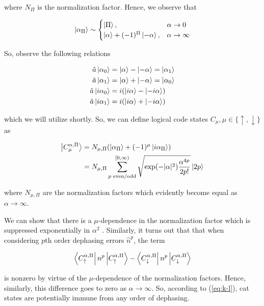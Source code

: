 \documentclass[12]{amsart}
\newcommand\0{\mathbf{0}}
\newcommand\<{\langle}
\renewcommand\>{\rangle}
\begin{document}
where $N_\Pi$ is the normalization factor. Hence, we observe that

\begin{align*}
\ket{\alpha_\Pi} \sim \begin{cases} \ket{\Pi},  &\alpha \rightarrow 0\\ \ket{\alpha} + (-1)^\Pi \ket{-\alpha}, &\alpha \rightarrow \infty \end{cases}
\end{align*}

So, observe the following relations

\begin{align}
\label{eq:cat-rels}
\begin{split}
\hat{a} \ket{\alpha_0} &= \ket{\alpha} - \ket{-\alpha} = \ket{\alpha_1} \\
\hat{a} \ket{\alpha_1} &= \ket{\alpha} + \ket{-\alpha} = \ket{\alpha_0} \\
\hat{a} \ket{i\alpha_0} &= i(\ket{i\alpha} - \ket{-i\alpha})\\
\hat{a} \ket{i\alpha_1} &= i(\ket{i\alpha}  + \ket{-i\alpha})
\end{split}
\end{align}

which we will utilize shortly. So, we can define logical code states $C_\mu, \mu \in \{ \uparrow, \downarrow \}$ as 

\begin{align*}
\ket{C_\mu^{\alpha, \Pi}} &= N_{\mu, \Pi} (\ket{\alpha_\Pi} + (-1)^\mu \ket{i \alpha_\Pi})\\
&= N_{\mu, \Pi} \sum_{p\text{ even/odd}}^{[0, \infty)}\sqrt{\exp(-|\alpha|^2)\frac{
\alpha^{4p}}{2p!}}\ket{2p}
\end{align*}

where $N_{\mu, \Pi}$ are the normalization factors which evidently become equal as $\alpha \rightarrow \infty$. 


We can show that there is a $\mu$-dependence in the normalization factor which is suppressed exponentially in $\alpha^2$ \cite{albert2018multimode}. Similarly, it turns out that that when considering $p$th order dephasing errors $\hat{n}^p$, the term

$$
\bra{C^{\alpha, \Pi}_{\uparrow}} n^p \ket{C^{\alpha, \Pi}_{\uparrow}} - \bra{C^{\alpha, \Pi}_{\downarrow}} n^p \ket{C^{\alpha, \Pi}_{\downarrow}}
$$ 

is nonzero by virtue of the $\mu$-dependence of the normalization factors. Hence, similarly, this difference goes to zero as $\alpha \rightarrow \infty$. So, according to (\ref{eq:k-l}), cat states are potentially immune from any order of dephasing.
\end{document}
